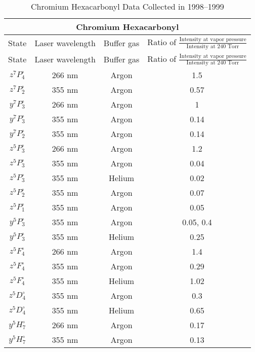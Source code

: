 \documentclass[12pt,twoside]{reedthesis}
\begin{document}
	\begin{longtable}{||c|c|c|c||}
	 	\caption[Chromium Hexacarbonyl Data Collected in 1998--1999]{Chromium Hexacarbonyl Data Collected in 1998--1999}\\ \hline
	    	  \multicolumn{4}{||c||}{Chromium Hexacarbonyl} \\\hline
		   State & Laser wavelength & Buffer gas & Ratio of $\frac{\textrm{Intensity
at vapor pressure}}{\textrm{Intensity at 240 Torr}}$ \\ \hline
		  \endfirsthead
		\hline     State & Laser wavelength & Buffer gas & Ratio of
$\frac{\textrm{Intensity at vapor pressure}}{\textrm{Intensity at 240 Torr}}$\\
\hline
		    \endhead

	    $z^{7}P^{\circ}_{4}$ & 266 nm & Argon & 1.5 \\\hline
	    $z^{7}P^{\circ}_{2}$ & 355 nm & Argon & 0.57 \\\hline
	    $y^{7}P^{\circ}_{3}$ & 266 nm & Argon & 1 \\\hline
	    $y^{7}P^{\circ}_{3}$ & 355 nm & Argon & 0.14 \\\hline
	    $y^{7}P^{\circ}_{2}$ & 355 nm & Argon & 0.14 \\\hline
	    $z^{5}P^{\circ}_{3}$ & 266 nm & Argon & 1.2 \\\hline
	    $z^{5}P^{\circ}_{3}$ & 355 nm & Argon & 0.04 \\\hline
	    $z^{5}P^{\circ}_{3}$ & 355 nm & Helium & 0.02 \\\hline
	    $z^{5}P^{\circ}_{2}$ & 355 nm & Argon & 0.07 \\\hline
	    $z^{5}P^{\circ}_{1}$ & 355 nm & Argon & 0.05 \\\hline
	    $y^{5}P^{\circ}_{3}$ & 355 nm & Argon & 0.05, 0.4 \\\hline
	    $y^{5}P^{\circ}_{3}$ & 355 nm & Helium & 0.25 \\\hline
	    $z^{5}F^{\circ}_{4}$ & 266 nm & Argon & 1.4 \\\hline
	    $z^{5}F^{\circ}_{4}$ & 355 nm & Argon & 0.29 \\\hline
	    $z^{5}F^{\circ}_{4}$ & 355 nm & Helium & 1.02 \\\hline
	    $z^{5}D^{\circ}_{4}$ & 355 nm & Argon & 0.3 \\\hline
	    $z^{5}D^{\circ}_{4}$ & 355 nm & Helium & 0.65 \\\hline
	    $y^{5}H^{\circ}_{7}$ & 266 nm & Argon & 0.17 \\\hline
	    $y^{5}H^{\circ}_{7}$ & 355 nm & Argon & 0.13 \\\hline

\end{longtable}
\end{document}
